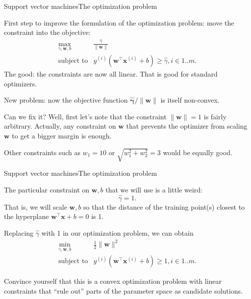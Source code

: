 \documentclass{beamer}
\renewcommand{\vec}[1]{\boldsymbol{#1}}
\begin{document}
\begin{frame}{Support vector machines}{The optimization problem}

  First step to improve the formulation of
  the optimization problem: \alert{move the constraint
  into the objective}:
  \[
  \begin{array}{rl}
    \max_{\gamma,\vec{w},b} & \frac{\hat{\gamma}}{\| \vec{w} \|} \\
    \text{subject to} & y^{(i)}(\vec{w}^\top\vec{x}^{(i)} + b) \ge \hat{\gamma}, i \in 1..m .
  \end{array}
  \]
  The good: the constraints are now all \alert{linear}. That is good
  for standard optimizers.

  \medskip

  New problem: now the objective function $\vec{\hat{\gamma}}/{\|\vec{w}\|}$
  is itself non-convex.

  \medskip

  Can we fix it?  Well, first let's note that the constraint $\|\vec{w}\|=1$
  is fairly arbitrary. Actually, any constraint on $\vec{w}$ that prevents
  the optimizer from scaling $\vec{w}$ to get a bigger margin is enough.

  \medskip

  Other constraints such as $w_1 = 10$ or $\sqrt{w_1^2 + w_2^2} = 3$
  would be equally good.
  
\end{frame}


\begin{frame}{Support vector machines}{The optimization problem}

  The particular constraint on $\vec{w},b$ that we will use is a
  little weird:
  \[ \hat{\gamma}=1 .\]
  That is, we will scale $\vec{w},b$ so that the distance of the training
  point(s) closest to the hyperplane $\vec{w}^\top \vec{x} + b = 0$ is 1.

  \medskip

  Replacing $\hat{\gamma}$ with 1 in our optimization problem, we can
  obtain
  \[
  \begin{array}{rl}
    \min_{\gamma,\vec{w},b} & \frac{1}{2} \| \vec{w} \|^2 \\
    \text{subject to} & y^{(i)}(\vec{w}^\top\vec{x}^{(i)} + b) \ge 1, i \in 1..m .
  \end{array}
  \]

  Convince yourself that this is a convex optimization problem with
  linear constraints that ``rule out'' parts of the parameter space as
  candidate solutions.
  
\end{frame}
\end{document}
